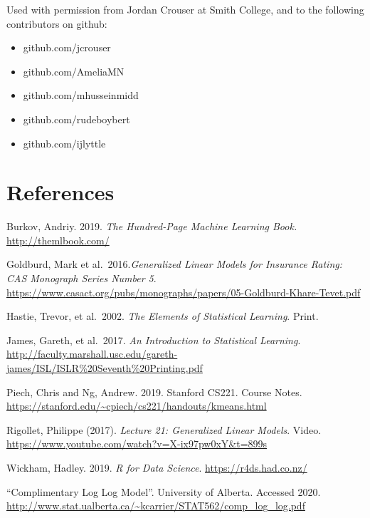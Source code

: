 \documentclass[openany]{book}
\providecommand{\tightlist}{%
  \setlength{\itemsep}{0pt}\setlength{\parskip}{0pt}}
\begin{document}
Used with permission from Jordan Crouser at Smith College, and to the following contributors on github:

\begin{itemize}
\tightlist
\item
  github.com/jcrouser
\item
  github.com/AmeliaMN
\item
  github.com/mhusseinmidd
\item
  github.com/rudeboybert
\item
  github.com/ijlyttle
\end{itemize}

\hypertarget{references-2}{%
\chapter{References}\label{references-2}}

Burkov, Andriy. 2019. \emph{The Hundred-Page Machine Learning Book.} \url{http://themlbook.com/}

Goldburd, Mark et al.~2016.\emph{Generalized Linear Models for Insurance Rating: CAS Monograph Series Number 5}. \url{https://www.casact.org/pubs/monographs/papers/05-Goldburd-Khare-Tevet.pdf}

Hastie, Trevor, et al.~2002. \emph{The Elements of Statistical Learning}. Print.

James, Gareth, et al.~2017. \emph{An Introduction to Statistical Learning}.
\url{http://faculty.marshall.usc.edu/gareth-james/ISL/ISLR\%20Seventh\%20Printing.pdf}

Piech, Chris and Ng, Andrew. 2019. Stanford CS221. Course Notes. \url{https://stanford.edu/~cpiech/cs221/handouts/kmeans.html}

Rigollet, Philippe (2017). \emph{Lecture 21: Generalized Linear Models}. Video. \url{https://www.youtube.com/watch?v=X-ix97pw0xY\&t=899s}

Wickham, Hadley. 2019. \emph{R for Data Science}. \url{https://r4ds.had.co.nz/}

``Complimentary Log Log Model''. University of Alberta. Accessed 2020. \url{http://www.stat.ualberta.ca/~kcarrier/STAT562/comp_log_log.pdf}


\end{document}
